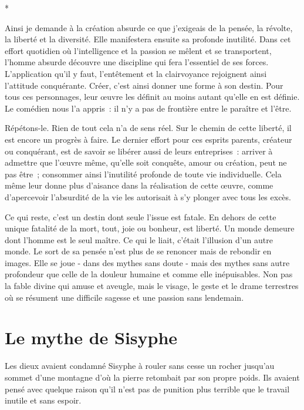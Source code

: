 \documentclass{book}
\begin{document}
\begin{center}
*
\end{center}

Ainsi je demande à la création absurde ce que j'exigeais de la pensée, la révolte, la liberté et la diversité. Elle manifestera ensuite sa profonde inutilité. Dans cet effort quotidien où l'intelligence et la passion se mêlent et se transportent, l'homme absurde découvre une discipline qui fera l'essentiel de ses forces. L'application qu'il y faut, l'entêtement et la clairvoyance rejoignent ainsi l'attitude conquérante. Créer, c'est ainsi donner une forme à son destin. Pour tous ces personnages, leur œuvre les définit au moins autant qu'elle en est définie. Le comédien nous l'a appris : il n'y a pas de frontière entre le paraître et l'être.

Répétons-le. Rien de tout cela n'a de sens réel. Sur le chemin de cette liberté, il est encore un progrès à faire. Le dernier effort pour ces esprits parents, créateur ou conquérant, est de savoir se libérer aussi de leurs entreprises : arriver à admettre que l'œuvre même, qu'elle soit conquête, amour ou création, peut ne pas être ; consommer ainsi l'inutilité profonde de toute vie individuelle. Cela même leur donne plus d'aisance dans la réalisation de cette œuvre, comme d'apercevoir l'absurdité de la vie les autorisait à s'y plonger avec tous les excès.

Ce qui reste, c'est un destin dont seule l'issue est fatale. En dehors de cette unique fatalité de la mort, tout, joie ou bonheur, est liberté. Un monde demeure dont l'homme est le seul maître. Ce qui le liait, c'était l'illusion d'un autre monde. Le sort de sa pensée n'est plus de se renoncer mais de rebondir en images. Elle se joue - dans des mythes sans doute - mais des mythes sans autre profondeur que celle de la douleur humaine et comme elle inépuisables. Non pas la fable divine qui amuse et aveugle, mais le visage, le geste et le drame terrestres où se résument une difficile sagesse et une passion sans lendemain.

\chapter{Le mythe de Sisyphe}

Les dieux avaient condamné Sisyphe à rouler sans cesse un rocher jusqu'au sommet d'une montagne d'où la pierre retombait par son propre poids. Ils avaient pensé avec quelque raison qu'il n'est pas de punition plus terrible que le travail inutile et sans espoir.
\end{document}
